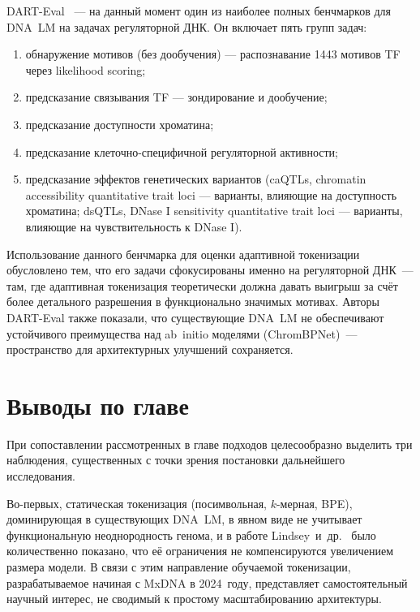 DART-Eval~\cite{patel2025dartevalcomprehensivednalanguage} --- на
данный момент один из наиболее полных бенчмарков для DNA~LM на
задачах регуляторной ДНК. Он включает пять групп задач:
\begin{enumerate}
  \item обнаружение мотивов (без дообучения) --- распознавание 1443
    мотивов TF через likelihood scoring;
  \item предсказание связывания TF --- зондирование и дообучение;
  \item предсказание доступности хроматина;
  \item предсказание клеточно-специфичной регуляторной активности;
  \item предсказание эффектов генетических вариантов (caQTLs,
      chromatin accessibility quantitative trait loci --- варианты,
      влияющие на доступность хроматина; dsQTLs,
      DNase I sensitivity quantitative trait loci --- варианты,
    влияющие на чувствительность к DNase I).
\end{enumerate}

Использование данного бенчмарка для оценки адаптивной токенизации
обусловлено тем, что его задачи сфокусированы именно на регуляторной
ДНК~--- там, где адаптивная токенизация теоретически должна давать
выигрыш за счёт более детального разрешения в функционально значимых
мотивах. Авторы DART-Eval также показали, что существующие DNA~LM не
обеспечивают устойчивого преимущества над ab~initio моделями
(ChromBPNet)~--- пространство для архитектурных улучшений сохраняется.

\section{Выводы по главе}

При сопоставлении рассмотренных в главе подходов целесообразно
выделить три наблюдения, существенных с точки зрения постановки
дальнейшего исследования.

Во-первых, статическая токенизация (посимвольная, $k$-мерная, BPE),
доминирующая в существующих DNA~LM, в явном виде не учитывает
функциональную неоднородность генома, и в работе
Lindsey~и~др.~\cite{lindseyImpactTokenizerSelection2025} было
количественно показано, что её ограничения не компенсируются
увеличением размера модели. В связи с этим направление обучаемой
токенизации, разрабатываемое начиная с MxDNA в 2024~году, представляет
самостоятельный научный интерес, не сводимый к простому масштабированию
архитектуры.


